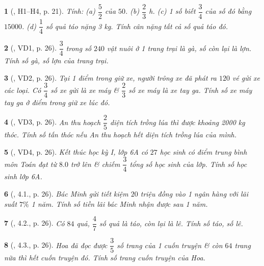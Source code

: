 \documentclass{article}
\newtheorem{baitoan}{}
\begin{document}
\begin{baitoan}[\cite{Binh_boi_duong_Toan_6_tap_2}, H1--H4, p. 21]
	Tính: (a) $\dfrac{5}{2}$ của $50$. (b) $\dfrac{2}{3}$ {\rm h}. (c) 1 số biết $\dfrac{3}{4}$ của số đó bằng $15000$. (d) $\dfrac{1}{4}$ số quả táo nặng {\rm3 kg}. Tính cân nặng tất cả số quả táo đó.
\end{baitoan}

\begin{baitoan}[\cite{Binh_boi_duong_Toan_6_tap_2}, VD1, p. 26]
	$\dfrac{3}{4}$ trong số $240$ vật nuôi ở 1 trang trại là gà, số còn lại là lợn. Tính số gà, số lợn của trang trại.
\end{baitoan}

\begin{baitoan}[\cite{Binh_boi_duong_Toan_6_tap_2}, VD2, p. 26]
	Tại 1 điểm trong giữ xe, người trông xe đã phát ra $120$ vé gửi xe các loại. Có $\dfrac{3}{4}$ số xe gửi là xe máy \& $\dfrac{2}{3}$ số xe máy là xe tay ga. Tính số xe máy tay ga ở điểm trong giữ xe lúc đó.
\end{baitoan}

\begin{baitoan}[\cite{Binh_boi_duong_Toan_6_tap_2}, VD3, p. 26]
	An thu hoạch $\dfrac{2}{5}$ diện tích trồng lúa thì được khoảng {\rm2000 kg} thóc. Tính số tấn thóc nếu An thu hoạch hết diện tích trồng lúa của mình.
\end{baitoan}

\begin{baitoan}[\cite{Binh_boi_duong_Toan_6_tap_2}, VD4, p. 26]
	Kết thúc học kỳ I, lớp 6A có $27$ học sinh có điểm trung bình môn Toán đạt từ $8.0$ trở lên \& chiếm $\dfrac{3}{4}$ tổng số học sinh của lớp. Tính số học sinh lớp 6A.
\end{baitoan}

\begin{baitoan}[\cite{Binh_boi_duong_Toan_6_tap_2}, 4.1., p. 26]
	Bác Minh gửi tiết kiệm $20$ triệu đồng vào 1 ngân hàng với lãi suất $7\%$ 1 năm. Tính số tiền lãi bác Minh nhận được sau 1 năm.
\end{baitoan}

\begin{baitoan}[\cite{Binh_boi_duong_Toan_6_tap_2}, 4.2., p. 26]
	Có $84$ quả, $\dfrac{4}{7}$ số quả là táo, còn lại là lê. Tính số táo, số lê.
\end{baitoan}

\begin{baitoan}[\cite{Binh_boi_duong_Toan_6_tap_2}, 4.3., p. 26]
	Hoa đã đọc được $\dfrac{3}{5}$ số trang của 1 cuốn truyện \& còn $64$ trang nữa thì hết cuốn truyện đó. Tính số trang cuốn truyện của Hoa.
\end{baitoan}
\end{document}
